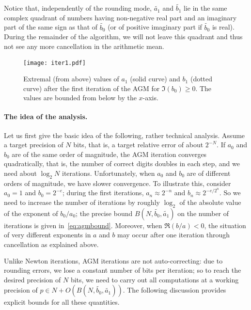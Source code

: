\documentclass [11pt]{article}
\newcommand {\appro}[1]{\widetilde {#1}}
\renewcommand {\geq}{\geqslant}
\begin{document}
Notice that, independently of the rounding mode,
$\appro {a_1}$ and $\appro {b_1}$ lie in the same complex quadrant
of numbers having non-negative real part and an imaginary part of the same
sign as that of $\appro {b_0}$
(or of positive imaginary part if $\appro {b_0}$ is real).
During the remainder of the algorithm, we will not leave this quadrant
and thus not see any more cancellation in the arithmetic mean.

\begin{figure}[htp]
\centerline{\texttt{[image: iter1.pdf]}}
  \caption{Extremal (from above) values of $a_1$ (solid curve) and
    $b_1$ (dotted curve) after the first iteration of the AGM for
    $\Im (b_0) \geq 0$.
    The values are bounded from below by the $x$-axis.}
\end{figure}

\paragraph {The idea of the analysis.}

Let us first give the basic idea of the following, rather technical
analysis.
Assume a target precision of $N$ bits, that is, a target relative error
of about $2^{-N}$. If $a_0$ and $b_0$ are of the same order of magnitude, the AGM
iteration converges quadratically, that is, the number of correct digits
doubles in each step, and we need about $\log_2 N$ iterations.
Unfortunately, when $a_0$ and $b_0$ are of different orders of magnitude, we have
slower convergence. To illustrate this, consider $a_0 = 1$ and
$b_0 = 2^{-e}$; during the first
iterations, $a_n \approx 2^{-n}$ and $b_n \approx 2^{-e/2^n}$. So we need
to increase the number of iterations by roughly $\log_2$ of the absolute
value of the exponent of $b_0/a_0$; the precise bound
$B \left( N, \appro {b_0}, \appro {a_1} \right)$ on
the number of iterations is given in~\eqref {eq:agmbound}.
Moreover, when $\Re (b/a) < 0$, the situation of very different exponents
in $a$ and $b$ may occur after one iteration through cancellation as
explained above.

Unlike Newton iterations, AGM iterations are not auto-correcting:
due to rounding errors, we lose a constant number of bits per iteration;
so to reach the desired precision of $N$ bits, we need to carry out all
computations at a working precision of
$p \in N + O \left( B (N, \appro {b_0}, \appro {a_1}) \right)$.
The following discussion provides explicit bounds for all these quantities.
\end{document}

